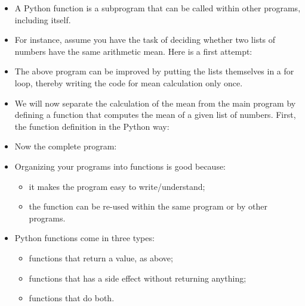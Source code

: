 \documentclass[a4paper]{article}
\begin{document}
\begin{itemize}

\item A Python function is a subprogram that can be called within other programs, including itself. 

\item For instance, assume you have the task of deciding whether two lists of numbers have the same arithmetic mean. Here is a first attempt: 

\begin{ucodeframe}
\end{ucodeframe}


\item The above program can be improved by putting the lists
themselves in a for loop, thereby writing the code for mean
calculation only once.

\begin{ucodeframe}
\end{ucodeframe}

\item We will now separate the calculation of the mean from the main
program by defining a function that computes the mean of a given list
of numbers. First, the function definition in the Python way:

\begin{ucodeframe}
\end{ucodeframe}


\item Now the complete program:

\begin{ucodeframe}
\end{ucodeframe}

\item Organizing your programs into functions is good because:
	\begin{itemize}
	\item it makes the program easy to write/understand; 
	\item the function can be re-used within the same program or by other programs. 
	\end{itemize}

\item Python functions come in three types:
\begin{itemize}
\item functions that return a value, as above;
\item functions that has a side effect without returning anything;
\item functions that do both.
\end{itemize}


\end{itemize}
\end{document}
